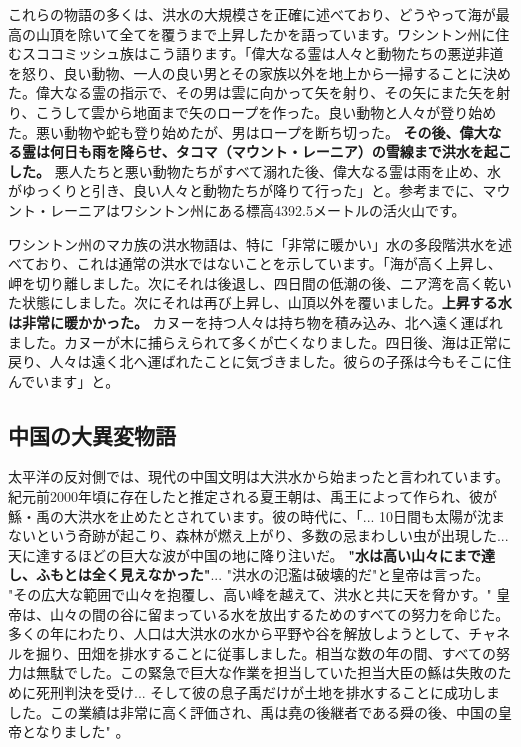 \documentclass[10pt,twocolumn,letterpaper]{article}
\begin{document}
これらの物語の多くは、洪水の大規模さを正確に述べており、どうやって海が最高の山頂を除いて全てを覆うまで上昇したかを語っています。ワシントン州に住むスココミッシュ族はこう語ります。「偉大なる霊は人々と動物たちの悪逆非道を怒り、良い動物、一人の良い男とその家族以外を地上から一掃することに決めた。偉大なる霊の指示で、その男は雲に向かって矢を射り、その矢にまた矢を射り、こうして雲から地面まで矢のロープを作った。良い動物と人々が登り始めた。悪い動物や蛇も登り始めたが、男はロープを断ち切った。 \textbf{その後、偉大なる霊は何日も雨を降らせ、タコマ（マウント・レーニア）の雪線まで洪水を起こした。} 悪人たちと悪い動物たちがすべて溺れた後、偉大なる霊は雨を止め、水がゆっくりと引き、良い人々と動物たちが降りて行った」と\cite{3}。参考までに、マウント・レーニアはワシントン州にある標高4392.5メートルの活火山です。

ワシントン州のマカ族の洪水物語は、特に「非常に暖かい」水の多段階洪水を述べており、これは通常の洪水ではないことを示しています。「海が高く上昇し、岬を切り離しました。次にそれは後退し、四日間の低潮の後、ニア湾を高く乾いた状態にしました。次にそれは再び上昇し、山頂以外を覆いました。\textbf{上昇する水は非常に暖かかった。} カヌーを持つ人々は持ち物を積み込み、北へ遠く運ばれました。カヌーが木に捕らえられて多くが亡くなりました。四日後、海は正常に戻り、人々は遠く北へ運ばれたことに気づきました。彼らの子孫は今もそこに住んでいます」と\cite{3}。

\subsection{中国の大異変物語}

太平洋の反対側では、現代の中国文明は大洪水から始まったと言われています。紀元前2000年頃に存在したと推定される夏王朝は、禹王によって作られ、彼が鯀・禹の大洪水を止めたとされています\cite{6}。彼の時代に、「... 10日間も太陽が沈まないという奇跡が起こり、森林が燃え上がり、多数の忌まわしい虫が出現した... 天に達するほどの巨大な波が中国の地に降り注いだ。 \textbf{"水は高い山々にまで達し、ふもとは全く見えなかった"}... "洪水の氾濫は破壊的だ"と皇帝は言った。 "その広大な範囲で山々を抱覆し、高い峰を越えて、洪水と共に天を脅かす。" 皇帝は、山々の間の谷に留まっている水を放出するためのすべての努力を命じた。多くの年にわたり、人口は大洪水の水から平野や谷を解放しようとして、チャネルを掘り、田畑を排水することに従事しました。相当な数の年の間、すべての努力は無駄でした。この緊急で巨大な作業を担当していた担当大臣の鯀は失敗のために死刑判決を受け... そして彼の息子禹だけが土地を排水することに成功しました。この業績は非常に高く評価され、禹は堯の後継者である舜の後、中国の皇帝となりました" \cite{5}。
\end{document}
